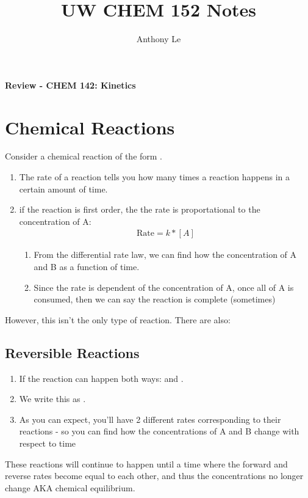 \documentclass{article}  %
\title{UW CHEM 152 Notes}
\author{Anthony Le}
\begin{document}
\pagestyle{fancy}
\fancyhead{}
\fancyfoot[L]{\thepage}

\begin{center}
    \LARGE{\textbf{Review - CHEM 142: Kinetics}}
\end{center}

\section*{Chemical Reactions}
Consider a chemical reaction of the form .
\begin{enumerate}
    \item The rate of a reaction tells you how many times a reaction happens in a certain amount of time.
    \item if the reaction  is first order, the the rate is proportational to the concentration of A: 
    \begin{equation*}
        \begin{aligned}
            \text{Rate} = k * [A]    
        \end{aligned}
    \end{equation*}
    \begin{enumerate}
        \item From the differential rate law, we can find how the concentration of A and B as a function of time. 
        \item Since the rate is dependent of the concentration of A, once all of A is consumed, then we can say the reaction is complete (sometimes)
    \end{enumerate} 
\end{enumerate}

However, this isn't the only type of reaction. There are also:
\subsection*{Reversible Reactions}
\begin{enumerate}
    \item If the reaction can happen both ways:  and . 
    \item We write this as . 
    \item As you can expect, you'll have 2 different rates corresponding to their reactions - so you can find how the concentrations of A and B change with respect to time
\end{enumerate}
These reactions will continue to happen until a time where the forward and reverse rates become equal to each other, and thus the concentrations no longer change AKA chemical equilibrium.
\end{document}
